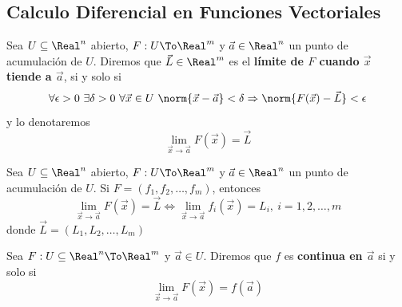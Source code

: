 \subsection{Calculo Diferencial en Funciones Vectoriales}
\begin{frame}
\subsectionpage
\end{frame}


\begin{frame}
  \begin{defn}
    Sea $U\subseteq\Real^n$ abierto, $F:U\To\Real^m$ y $\vec{a}\in\Real^n$ un punto de acumulación de $U$. Diremos que $\vec{L}\in\Real^m$ es el \textbf{límite de $F$ cuando $\vec{x}$ tiende a $\vec{a}$}, si y solo si
    $$\forall\epsilon>0\ \exists\delta>0\ \forall\vec{x}\in U\ \norm{\vec{x}-\vec{a}}<\delta\Rightarrow\norm{F(\vec{x})-\vec{L}}<\epsilon$$
    y lo denotaremos
    $$\lim_{\vec{x}\to\vec{a}}F(\vec{x})=\vec{L}$$
  \end{defn}
\end{frame}

\begin{frame}
  \begin{thm}
    Sea $U\subseteq\Real^n$ abierto, $F:U\To\Real^m$ y $\vec{a}\in\Real^n$ un punto de acumulación de $U$. Si $F=(f_1,f_2,\ldots,f_m)$, entonces
    $$\lim_{\vec{x}\to\vec{a}}F(\vec{x})=\vec{L}\Longleftrightarrow\lim_{\vec{x}\to\vec{a}}f_i(\vec{x})=L_i,\ i=1,2,\ldots,m$$
    donde $\vec{L}=(L_1,L_2,\ldots,L_m)$
  \end{thm}
\end{frame}

\begin{frame}
  \begin{defn}
    Sea $F:U\subseteq\Real^n\To\Real^m$ y $\vec{a}\in U$. Diremos que $f$ es \textbf{continua en $\vec{a}$} si y solo si
    $$\lim_{\vec{x}\to\vec{a}}F(\vec{x})=f(\vec{a})$$
  \end{defn}
\end{frame}

